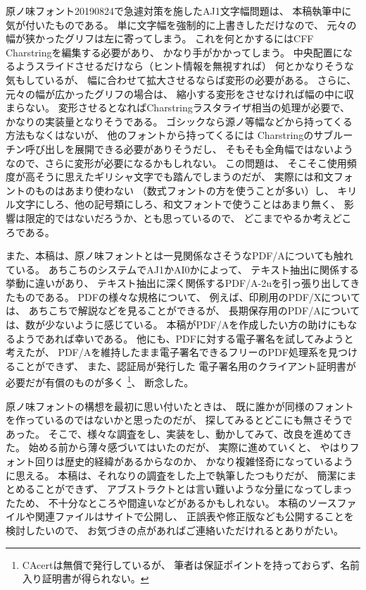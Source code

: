 原ノ味フォント20190824で急遽対策を施したAJ1文字幅問題は、
本稿執筆中に気が付いたものである。
単に文字幅を強制的に上書きしただけなので、
元々の幅が狭かったグリフは左に寄ってしまう。
これを何とかするにはCFF Charstringを編集する必要があり、
かなり手がかかってしまう。
中央配置になるようスライドさせるだけなら（ヒント情報を無視すれば）
何とかなりそうな気もしているが、
幅に合わせて拡大させるならば変形の必要がある。
さらに、元々の幅が広かったグリフの場合は、
縮小する変形をさせなければ幅の中に収まらない。
変形させるとなればCharstringラスタライザ相当の処理が必要で、
かなりの実装量となりそうである。
ゴシックなら源ノ等幅などから持ってくる方法もなくはないが、
他のフォントから持ってくるには
Charstringのサブルーチン呼び出しを展開できる必要がありそうだし、
そもそも全角幅ではないようなので、さらに変形が必要になるかもしれない。
この問題は、
そこそこ使用頻度が高そうに思えたギリシャ文字でも踏んでしまうのだが、
実際には和文フォントのものはあまり使わない
（数式フォントの方を使うことが多い）し、
キリル文字にしろ、他の記号類にしろ、和文フォントで使うことはあまり無く、
影響は限定的ではないだろうか、とも思っているので、
どこまでやるか考えどころである。

また、本稿は、原ノ味フォントとは一見関係なさそうなPDF/Aについても触れている。
あちこちのシステムでAJ1かAI0かによって、
テキスト抽出に関係する挙動に違いがあり、
テキスト抽出に深く関係するPDF/A-2uを引っ張り出してきたものである。
PDFの様々な規格について、
例えば、印刷用のPDF/Xについては、
あちこちで解説などを見ることができるが、
長期保存用のPDF/Aについては、数が少ないように感じている。
本稿がPDF/Aを作成したい方の助けにもなるようであれば幸いである。
他にも、PDFに対する電子署名を試してみようと考えたが、
PDF/Aを維持したまま電子署名できるフリーのPDF処理系を見つけることができず、
また、認証局が発行した
電子署名用のクライアント証明書が必要だが有償のものが多く
\footnote{CAcertは無償で発行しているが、
  筆者は保証ポイントを持っておらず、名前入り証明書が得られない。}、
断念した。

原ノ味フォントの構想を最初に思い付いたときは、
既に誰かが同様のフォントを作っているのではないかと思ったのだが、
探してみるとどこにも無さそうであった。
そこで、様々な調査をし、実装をし、動かしてみて、改良を進めてきた。
始める前から薄々感づいてはいたのだが、
実際に進めていくと、
やはりフォント回りは歴史的経緯があるからなのか、
かなり複雑怪奇になっているように思える。
本稿は、それなりの調査をした上で執筆したつもりだが、
簡潔にまとめることができず、
アブストラクトとは言い難いような分量になってしまったため、
不十分なところや間違いなどがあるかもしれない。
本稿のソースファイルや関連ファイルはサイト\cite{tr-texconf2019}で公開し、
正誤表や修正版なども公開することを検討したいので、
お気づきの点があればご連絡いただけれるとありがたい。

